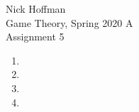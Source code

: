 \documentclass[11pt]{article}
\begin{document}
\begin{flushleft}
	Nick Hoffman \\
	Game Theory, Spring 2020 A \\
	Assignment 5 \\
\end{flushleft}

\begin{enumerate}
	\item 
	\item 
	\item 
	\item 
\end{enumerate}
\end{document}
